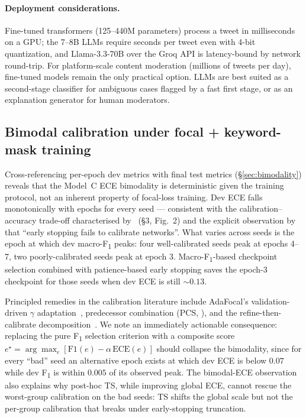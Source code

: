 \documentclass[10pt,a4paper]{article}
\begin{document}
\paragraph{Deployment considerations.}
Fine-tuned transformers (125--440M parameters) process a tweet in milliseconds on a GPU; the 7--8B LLMs require seconds per tweet even with 4-bit quantization, and Llama-3.3-70B over the Groq API is latency-bound by network round-trip. For platform-scale content moderation (millions of tweets per day), fine-tuned models remain the only practical option. LLMs are best suited as a second-stage classifier for ambiguous cases flagged by a fast first stage, or as an explanation generator for human moderators.

\subsection{Bimodal calibration under focal + keyword-mask training}
\label{sec:discussion:bimodality}

Cross-referencing per-epoch dev metrics with final test metrics (\S\ref{sec:bimodality}) reveals that the Model~C ECE bimodality is deterministic given the training protocol, not an inherent property of focal-loss training. Dev ECE falls monotonically with epochs for every seed --- consistent with the calibration--accuracy trade-off characterised by~\citet{mukhoti2020calibrating} (\S3, Fig.~2) and the explicit observation by~\citet{tao2023pcs} that ``early stopping fails to calibrate networks''. What varies across seeds is the epoch at which dev macro-F\textsubscript{1} peaks: four well-calibrated seeds peak at epochs 4--7, two poorly-calibrated seeds peak at epoch 3. Macro-F\textsubscript{1}-based checkpoint selection combined with patience-based early stopping saves the epoch-3 checkpoint for those seeds when dev ECE is still $\sim 0.13$.

Principled remedies in the calibration literature include AdaFocal's validation-driven $\gamma$ adaptation~\citep{ghosh2022adafocal}, predecessor combination (PCS, \citet{tao2023pcs}), and the refine-then-calibrate decomposition~\citep{holzmuller2025refine}. We note an immediately actionable consequence: replacing the pure F\textsubscript{1} selection criterion with a composite score $e^\star = \arg\max_e [\mathrm{F1}(e) - \alpha\,\mathrm{ECE}(e)]$ should collapse the bimodality, since for every ``bad'' seed an alternative epoch exists at which dev ECE is below $0.07$ while dev F\textsubscript{1} is within $0.005$ of its observed peak. The bimodal-ECE observation also explains why post-hoc TS, while improving global ECE, cannot rescue the worst-group calibration on the bad seeds: TS shifts the global scale but not the per-group calibration that breaks under early-stopping truncation.
\end{document}
